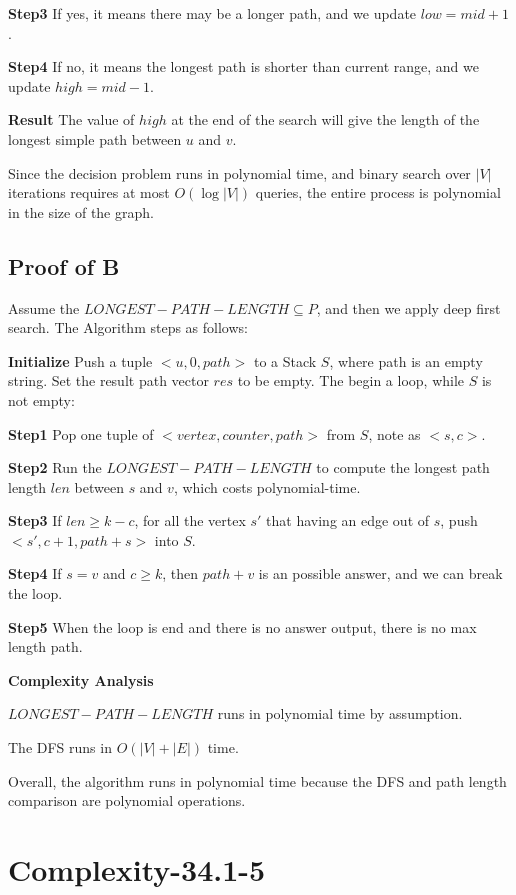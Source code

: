 \documentclass[12pt]{article}
\begin{document}
\textbf{Step3} If yes, it means there may be a longer path, and we update $low = mid + 1$.

\textbf{Step4} If no, it means the longest path is shorter than current range, and we update $high = mid - 1$.

\textbf{Result} The value of $high$ at the end of the search will give the length of the longest simple path between $u$ and $v$.

Since the decision problem runs in polynomial time, and binary search over $|V|$ iterations requires at most $O(\log |V|)$ queries, the entire process is polynomial in the size of the graph.

\subsection{Proof of B}
Assume the $LONGEST-PATH-LENGTH \subseteq P$, and then we apply deep first search. The Algorithm steps as follows:
 
\textbf{Initialize} Push a tuple $<u, 0, path>$ to a Stack $S$, where path is an empty string. Set the result path vector $res$ to be empty. The begin a loop, while $S$ is not empty:

\textbf{Step1} Pop one tuple of $<vertex, counter, path>$ from $S$, note as $<s, c>$. 

\textbf{Step2} Run the $LONGEST-PATH-LENGTH$ to compute the longest path length $len$ between $s$ and $v$, which costs polynomial-time.

\textbf{Step3} If $len \geq k-c$, for all the vertex $s'$ that having an edge out of $s$, push $<s', c+1, path+s>$ into $S$.

\textbf{Step4} If $s = v$ and $c \ge k$, then $path + v$ is an possible answer, and we can break the loop.   

\textbf{Step5} When the loop is end and there is no answer output, there is no max length path.

\textbf{Complexity Analysis}

 $LONGEST-PATH-LENGTH$ runs in polynomial time by assumption.

The DFS runs in $O(|V| + |E|)$ time.

Overall, the algorithm runs in polynomial time because the DFS and path length comparison are polynomial operations.



\section{Complexity-34.1-5}
\end{document}

